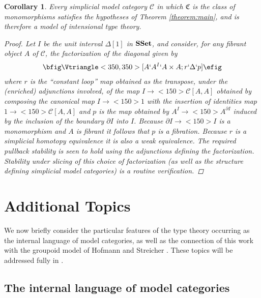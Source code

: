 \documentclass[12pt]{amsart}
\newcommand{\ssets}{\textnormal{\textbf{SSet}}}
\newtheorem{corollary}[theorem]{Corollary}
\theoremstyle{definition}
\theoremstyle{remark}
\begin{document}
\begin{corollary}
  Every simplicial model category $\mathcal{C}$ in which $\mathfrak{C}$ is
  the class of monomorphisms satisfies the hypotheses of Theorem
  \ref{theorem:main}, and is therefore a model of intensional type theory.
  \begin{proof}
    Let $I$ be the unit interval $\Delta[1]$ in $\ssets$, and consider, for any
    fibrant object $A$ of $\mathcal{C}$, the factorization of the
    diagonal given by 
    \begin{align*}
      \bfig
      \Vtriangle<350,350>[A`A^{I}`A\times A;r`\Delta`p]
      \efig
    \end{align*}
    where $r$ is the ``constant loop'' map obtained as the transpose,
    under the (enriched) adjunctions involved, of the map 
    $I\to<150>\mathcal{C}[A,A]$ obtained by composing the canonical
    map $I\to<150>1$ with the insertion of identities map
    $1\to<150>\mathcal{C}[A,A]$ and $p$ is the map obtained by
    $A^{I}\to<150>A^{\partial I}$ induced by the inclusion of the
    boundary $\partial I$ into $I$.  Because $\partial I\to<150>I$ is
    a monomorphism and $A$ is fibrant it follows that $p$ is a
    fibration.  Because $r$ is a simplicial homotopy equivalence it is
    also a weak equivalence.  The required pullback stability is seen
    to hold using the adjunctions defining the
    factorization.  Stability under slicing of this choice of
    factorization (as well as the structure defining simplicial model
    categories) is a routine verification.
  \end{proof}
\end{corollary}

\section{Additional Topics}\label{section:coherence}

We now briefly consider the particular features of the type theory occurring as the internal
language of model categories, as well as the connection of this work
with the groupoid model of Hofmann and Streicher \cite{Hofmann:GITT}.
These topics will be addressed fully in \cite{Warren:PhD}. 

\subsection{The internal language of model categories}
\end{document}
